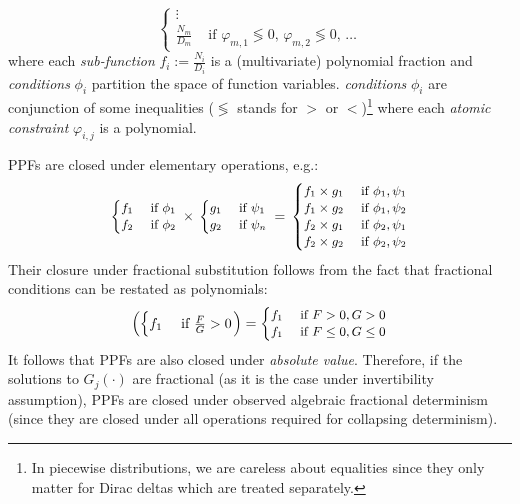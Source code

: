 \documentclass{article}
\newcommand{\bvec}[1]{\textbf{#1}}
\newcommand{\case}[2]{#2 &\text{ if } #1}%
\begin{document}
{\begin{equation}
\begin{cases}
\vdots\\
   \case{\varphi_{m,1} \lessgtr 0,\, \varphi_{m,2} \lessgtr 0,\, \ldots}{\frac{N_m}{D_m}}    
  \end{cases}
\end{equation}
where each \emph{sub-function} $f_i := \frac{N_i}{D_i}$ is a (multivariate) polynomial fraction and
\emph{conditions} $\phi_i$ partition the space of function variables. 
\emph{conditions} $\phi_i$ are conjunction of some inequalities ($\lessgtr$ stands for  
$>$ or $<$)\footnote{In piecewise distributions,  
we are careless about equalities since they only matter for Dirac deltas which are treated separately.
} 
where each \emph{atomic constraint} $\varphi_{i,j}$ is a polynomial.


PPFs are closed under elementary operations, e.g.:
\begin{equation*}
\footnotesize
  \begin{cases}
  \case{\phi_1}{f_1}\\
  \case{\phi_2}{f_2}    
  \end{cases}
\,
 \times
\,
  \begin{cases}
  \case{\psi_1}{g_1} \\
  \case{\psi_n}{g_2} 
  \end{cases}
 \, = \,
\begin{cases}
  \case{\phi_1, \psi_1}{f_1 \times g_1} \\ 
  \case{\phi_1, \psi_2}{f_1 \times g_2} \\
  \case{\phi_2, \psi_1}{f_2 \times g_1} \\
  \case{\phi_2, \psi_2}{f_2 \times g_2}
  \end{cases}
\end{equation*} 
Their closure under fractional substitution follows from the fact that 
fractional conditions can be restated as polynomials:
\begin{align*}
\left(
 \begin{cases}
  \case{\frac{F}{G} > 0}{f_1} \\ 
 \end{cases} 
\right)
 =
{\footnotesize
\begin{cases}
  \case{F > 0, G > 0 }{f_1} \\ 
  \case{F \leq 0, G \leq 0}{f_1} \\ 
 \end{cases} 
}
\end{align*}
It follows that PPFs are also closed under \emph{absolute value}.
Therefore, if the solutions to $G_j(\cdot)$ are fractional (as it is the case under invertibility assumption),
PPFs are closed under  observed algebraic fractional determinism 
(since they are closed under  
all operations required for collapsing determinism).

}
\end{document}
